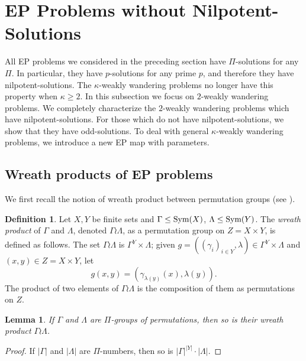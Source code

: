 \documentclass[10pt,a4paper]{amsart}
\newtheorem{lemma}[theorem]{Lemma}
\theoremstyle{definition}
\newtheorem{definition}[theorem]{Definition}
\theoremstyle{definition}
\numberwithin{equation}{section}
\begin{document}
\section{EP Problems without Nilpotent-Solutions}

All EP problems we considered in the preceding section have $\Pi$-solutions for any $\Pi$. In particular, they have $p$-solutions for any prime $p$, and therefore they have nilpotent-solutions. The $\kappa$-weakly wandering problems no longer have this property when $\kappa\geq 2$. In this subsection we focus on $2$-weakly wandering problems. We completely characterize the $2$-weakly wandering problems which have nilpotent-solutions. For those which do not have nilpotent-solutions, we show that they have odd-solutions. To deal with general $\kappa$-weakly wandering problems, we introduce a new EP map with parameters.


\subsection{Wreath products of EP problems}

We first recall the notion of wreath product between permutation groups (see \cite[Section 1.10]{RobinsonBook}).

\begin{definition}\label{def:wr} Let $X, Y$ be finite sets and $\Gamma\leq \mbox{\rm Sym}(X)$, $\Lambda\leq \mbox{\rm Sym}(Y)$. The {\em wreath product} of $\Gamma$ and $\Lambda$, denoted $\Gamma\wr\Lambda$, as a permutation group on $Z=X\times Y$, is defined as follows. The set $\Gamma\wr\Lambda$ is $\Gamma^Y\times \Lambda$; given $g=((\gamma_i)_{i\in Y}, \lambda)\in \Gamma^Y\times\Lambda$ and $(x, y)\in Z=X\times Y$, let
$$ g(x, y)=(\gamma_{\lambda(y)}(x), \lambda(y)). $$
The product of two elements of $\Gamma\wr\Lambda$ is the composition of them as permutations on $Z$.
\end{definition}

\begin{lemma}\label{lem:basicwr} If $\Gamma$ and $\Lambda$ are $\Pi$-groups of permutations, then so is their wreath product $\Gamma\wr\Lambda$.
\end{lemma}

\begin{proof} If $|\Gamma|$ and $|\Lambda|$ are $\Pi$-numbers, then so is $|\Gamma|^{|Y|}\cdot|\Lambda|$.
\end{proof}
\end{document}
